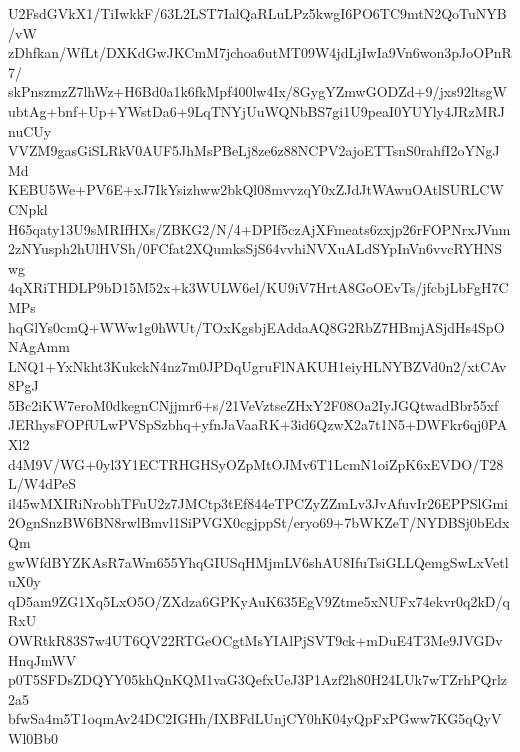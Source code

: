 U2FsdGVkX1/TiIwkkF/63L2LST7IalQaRLuLPz5kwgI6PO6TC9mtN2QoTuNYB/vW
zDhfkan/WfLt/DXKdGwJKCmM7jchoa6utMT09W4jdLjIwIa9Vn6won3pJoOPnR7/
skPnszmzZ7lhWz+H6Bd0a1k6fkMpf400lw4Ix/8GygYZmwGODZd+9/jxs92ltsgW
ubtAg+bnf+Up+YWstDa6+9LqTNYjUuWQNbBS7gi1U9peaI0YUYly4JRzMRJnuCUy
VVZM9gasGiSLRkV0AUF5JhMsPBeLj8ze6z88NCPV2ajoETTsnS0rahfI2oYNgJMd
KEBU5We+PV6E+xJ7IkYsizhww2bkQl08mvvzqY0xZJdJtWAwuOAtlSURLCWCNpkl
H65qaty13U9sMRIfHXs/ZBKG2/N/4+DPIf5czAjXFmeats6zxjp26rFOPNrxJVnm
2zNYusph2hUlHVSh/0FCfat2XQumksSjS64vvhiNVXuALdSYpInVn6vvcRYHNSwg
4qXRiTHDLP9bD15M52x+k3WULW6el/KU9iV7HrtA8GoOEvTs/jfcbjLbFgH7CMPs
hqGlYs0cmQ+WWw1g0hWUt/TOxKgsbjEAddaAQ8G2RbZ7HBmjASjdHs4SpONAgAmm
LNQ1+YxNkht3KukckN4nz7m0JPDqUgruFlNAKUH1eiyHLNYBZVd0n2/xtCAv8PgJ
5Bc2iKW7eroM0dkegnCNjjmr6+s/21VeVztseZHxY2F08Oa2IyJGQtwadBbr55xf
JERhysFOPfULwPVSpSzbhq+yfnJaVaaRK+3id6QzwX2a7t1N5+DWFkr6qj0PAXl2
d4M9V/WG+0yl3Y1ECTRHGHSyOZpMtOJMv6T1LcmN1oiZpK6xEVDO/T28L/W4dPeS
il45wMXIRiNrobhTFuU2z7JMCtp3tEf844eTPCZyZZmLv3JvAfuvIr26EPPSlGmi
2OgnSnzBW6BN8rwlBmvl1SiPVGX0cgjppSt/eryo69+7bWKZeT/NYDBSj0bEdxQm
gwWfdBYZKAsR7aWm655YhqGIUSqHMjmLV6shAU8IfuTsiGLLQemgSwLxVetluX0y
qD5am9ZG1Xq5LxO5O/ZXdza6GPKyAuK635EgV9Ztme5xNUFx74ekvr0q2kD/qRxU
OWRtkR83S7w4UT6QV22RTGeOCgtMsYIAlPjSVT9ck+mDuE4T3Me9JVGDvHnqJmWV
p0T5SFDsZDQYY05khQnKQM1vaG3QefxUeJ3P1Azf2h80H24LUk7wTZrhPQrlz2a5
bfwSa4m5T1oqmAv24DC2IGHh/IXBFdLUnjCY0hK04yQpFxPGww7KG5qQyVWl0Bb0
